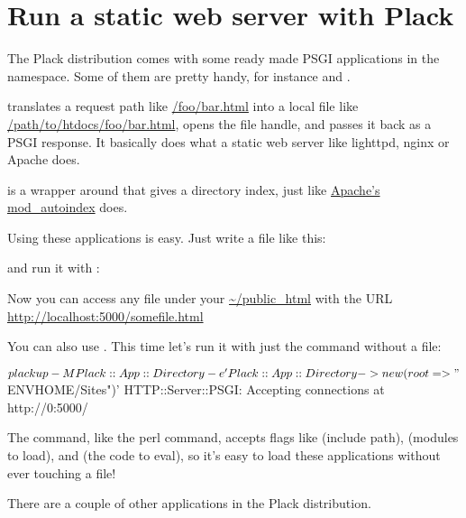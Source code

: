 \chapter{Run a static web server with Plack}\label{day-5-run-a-static-web-server-with-plack}

The Plack distribution comes with some ready made PSGI applications in
the  namespace. Some of them are pretty handy, for instance
\href{http://search.cpan.org/perldoc?Plack::App::File}{}
and
\href{http://search.cpan.org/perldoc?Plack::App::Directory}{}.

 translates a request path like
\url{/foo/bar.html} into a local file like
\url{/path/to/htdocs/foo/bar.html}, opens the file handle, and
passes it back as a PSGI response. It basically does what a static web
server like lighttpd, nginx or Apache does.

 is a wrapper around  that gives a
directory index, just like
\href{http://httpd.apache.org/docs/2.0/mod/mod_autoindex.html}{Apache's
mod\_autoindex} does.

Using these applications is easy. Just write a  file like this:

%
and run it with :


Now you can access any file under your \url{~/public_html} with
the URL \url{http://localhost:5000/somefile.html}

You can also use . This time let's run it with just
the  command without a  file:

\begin{shell}
$ plackup -MPlack::App::Directory -e 'Plack::App::Directory->new(root => "$ENV{HOME}/Sites")'
HTTP::Server::PSGI: Accepting connections at http://0:5000/
\end{shell}

The  command, like the perl command, accepts flags like
 (include path),  (modules to load), and
 (the code to eval), so it's easy to load these
 applications without ever touching a  file!

There are a couple of other  applications in the Plack
distribution.


